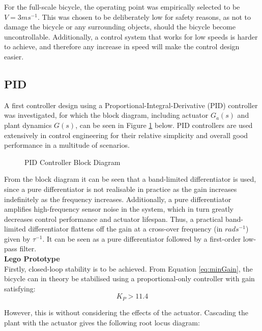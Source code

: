 For the full-scale bicycle, the operating point was empirically selected to be $V=3ms^{-1}$. This was chosen to be deliberately low for safety reasons, as not to damage the bicycle or any surrounding objects, should the bicycle become uncontrollable. Additionally, a control system that works for low speeds is harder to achieve, and therefore any increase in speed will make the control design easier.

\subsection{PID}
A first controller design using a Proportional-Integral-Derivative (PID) controller was investigated, for which the block diagram, including actuator $G_a(s)$ and plant dynamics $G(s)$, can be seen in Figure \ref{fig:PID} below. PID controllers are used extensively in control engineering for their relative simplicity and overall good performance in a multitude of scenarios.

\begin{figure}[H]
	\centering
    \def\svgwidth{0.75\textwidth}
    
    \caption{PID Controller Block Diagram}
	\label{fig:PID}
\end{figure}

From the block diagram it can be seen that a band-limited differentiator is used, since a pure differentiator is not realisable in practice as the gain increases indefinitely as the frequency increases. Additionally, a pure differentiator amplifies high-frequency sensor noise in the system, which in turn greatly decreases control performance and actuator lifespan. Thus, a practical band-limited differentiator flattens off the gain at a cross-over frequency (in $rads^{-1}$) given by $\tau^{-1}$. It can be seen as a pure differentiator followed by a first-order low-pass filter. \\

\textbf{Lego Prototype} \\
Firstly, closed-loop stability is to be achieved. From Equation \ref{eq:minGain}, the bicycle can in theory be stabilised using a proportional-only controller with gain satisfying:
\begin{equation*}
K_P > 11.4
\end{equation*}

However, this is without considering the effects of the actuator. Cascading the plant with the actuator gives the following root locus diagram:

